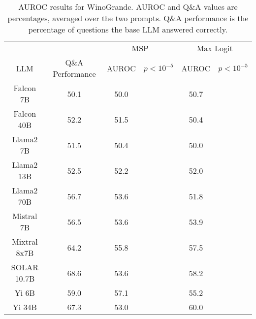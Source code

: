 \begin{table*}
\centering
\begin{tabular}{c|c|c|c|c|c}
& & \multicolumn{2}{c|}{MSP} & \multicolumn{2}{c}{Max Logit} \\ 
LLM & Q\&A Performance & AUROC & $p < 10^{-5}$ & AUROC & $p < 10^{-5}$\\ \hline
Falcon 7B & 50.1 & 50.0 &  & 50.7 & \\
Falcon 40B & 52.2 & 51.5 &  & 50.4 & \\
Llama2 7B & 51.5 & 50.4 &  & 50.0 & \\
Llama2 13B & 52.5 & 52.2 &  & 52.0 & \\
Llama2 70B & 56.7 & 53.6 &  & 51.8 & \\
Mistral 7B & 56.5 & 53.6 &  & 53.9 & \\
Mixtral 8x7B & 64.2 & 55.8 &  & 57.5 & \\
SOLAR 10.7B & 68.6 & 53.6 &  & 58.2 & \\
Yi 6B & 59.0 & 57.1 &  & 55.2 & \\
Yi 34B & 67.3 & 53.0 &  & 60.0 & \\
\hline
\end{tabular}
\caption{AUROC results for WinoGrande. AUROC and Q\&A values are percentages, averaged over the two prompts. Q\&A performance is the percentage of questions the base LLM answered correctly.}
\label{tab:winogrande_auroc}
\end{table*}
